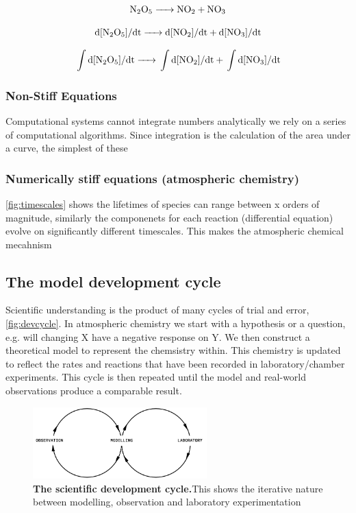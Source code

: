 \begin{equation}
\ce{N2O5 ->	NO2} + \ce{NO3}
\label{eqn:numerical1}
\end{equation}

\begin{equation}
\ce{ d[N2O5]/dt ->	d[NO2]/dt} + \ce{d[NO3]/dt}
\label{eqn:numerical2}
\end{equation}

\begin{equation}
\ce{ \int d[N2O5]/dt ->	\int d[NO2]/dt} + \ce{\int d[NO3]/dt}
\label{eqn:numerical3}
\end{equation}

\subsubsection{Non-Stiff Equations}
Computational systems cannot integrate numbers analytically we rely on a series of computational algorithms. Since integration is the calculation of the area under a curve, the simplest of these

\subsubsection{Numerically stiff equations (atmospheric chemistry)}
\autoref{fig:timescales} shows the lifetimes of species can range between x orders of magnitude, similarly the componenets for each reaction (differential equation) evolve on significantly different timescales. This makes the atmospheric chemical mecahnism

\subsection{The model development cycle}
Scientific understanding is the product of many cycles of trial and error, \autoref{fig:devcycle}. In atmospheric chemistry we start with a hypothesis or a question, e.g. will changing X have a negative response on Y. We then construct a theoretical model to represent the chemsistry within. This chemistry is updated to reflect the rates and reactions that have been recorded in laboratory/chamber experiments. This cycle is then repeated until the model and real-world observations produce a comparable result.

\begin{figure}[H]
    \centering
    \includegraphics[width=0.6\textwidth]{devcycle.png}
    \caption{\textbf{The scientific development cycle.}This shows the iterative nature between modelling, observation and laboratory experimentation}
    \label{fig:devcycle}
\end{figure}






